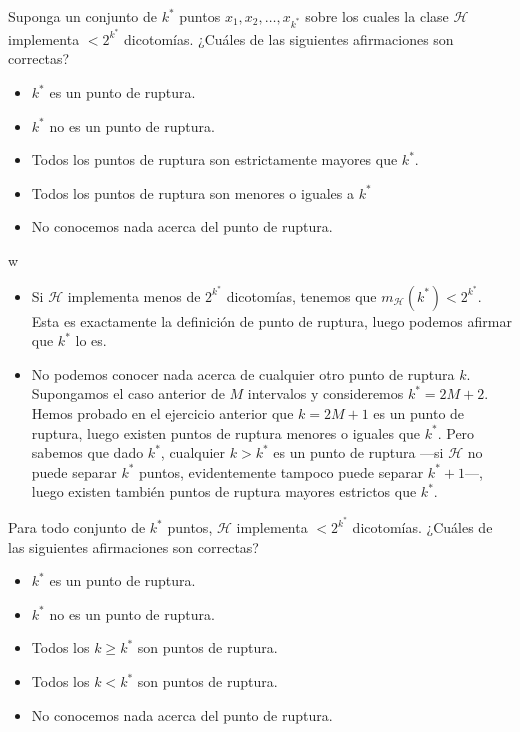 \documentclass[a4paper, 11pt]{article}
\begin{document}
    \begin{ejercicio}
        Suponga un conjunto de $k^*$ puntos $x_1, x_2 , \dots , x_{k^*}$ sobre los cuales la clase $\mathcal{H}$ implementa $< 2^{k^*}$ dicotomías. ¿Cuáles de las siguientes afirmaciones son correctas?
        \begin{itemize}
            \item $k^*$ es un punto de ruptura.
            \item $k^*$ no es un punto de ruptura.
            \item Todos los puntos de ruptura son estrictamente mayores que $k^*$.
            \item Todos los puntos de ruptura son menores o iguales a $k^*$
            \item No conocemos nada acerca del punto de ruptura.
        \end{itemize}
    \end{ejercicio}

    \begin{solucion}
        w

        \begin{itemize}
            \item Si $\mathcal{H}$ implementa menos de $2^{k^*}$ dicotomías, tenemos que $m_{\mathcal{H}}(k^*) < 2^{k^*}$. Esta es exactamente la definición de punto de ruptura, luego podemos afirmar que $k^*$ lo es.
            \item No podemos conocer nada acerca de cualquier otro punto de ruptura $k$. Supongamos el caso anterior de $M$ intervalos y consideremos $k^* = 2M + 2$. Hemos probado en el ejercicio anterior que $k = 2M + 1$ es un punto de ruptura, luego existen puntos de ruptura menores o iguales que $k^*$. Pero sabemos que dado $k^*$, cualquier $k > k^*$ es un punto de ruptura ---si $\mathcal{H}$ no puede separar $k^*$ puntos, evidentemente tampoco puede separar $k^* + 1$---, luego existen también puntos de ruptura mayores estrictos que $k^*$.
        \end{itemize}
    \end{solucion}


    \begin{ejercicio}
        Para todo conjunto de $k^*$ puntos, $\mathcal{H}$ implementa $< 2^{k^*}$ dicotomías. ¿Cuáles de las siguientes afirmaciones son correctas?
        \begin{itemize}
            \item $k^*$ es un punto de ruptura.
            \item $k^*$ no es un punto de ruptura.
            \item Todos los $k \geq k^*$ son puntos de ruptura.
            \item Todos los $k < k^*$ son puntos de ruptura.
            \item No conocemos nada acerca del punto de ruptura.
        \end{itemize}
    \end{ejercicio}
\end{document}
